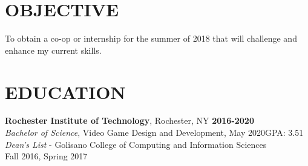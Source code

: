 \documentclass[line,margin]{res}
\begin{document}

\noindent
\makebox[0pt][l]{}%
\makebox[\textwidth][c]{}%
\makebox[0pt][l]{}%
\makebox[\textwidth][c]{}%
\makebox[0pt][l]{}%
\makebox[\textwidth][c]{}%



\begin{resume}

\section{OBJECTIVE}
To obtain a co-op or internship for the summer of 2018 that will challenge 
and enhance my current skills.



\section{EDUCATION}
\textbf{Rochester Institute of Technology}, Rochester, NY\hfill
    \textbf{2016-2020}\\
{\sl Bachelor of Science}, Video Game Design and Development, May 2020\hfill GPA: 3.51
\\
{\sl Dean's List} - Golisano College of Computing and Information Sciences\hfill \\ Fall 2016, Spring 2017

\end{resume}
\end{document}
